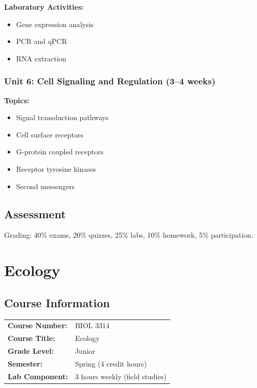 \documentclass[12pt,oneside]{book}
\begin{document}
\textbf{Laboratory Activities:}
\begin{itemize}
    \item Gene expression analysis
    \item PCR and qPCR
    \item RNA extraction
\end{itemize}

\subsection{Unit 6: Cell Signaling and Regulation (3--4 weeks)}

\textbf{Topics:}
\begin{itemize}
    \item Signal transduction pathways
    \item Cell surface receptors
    \item G-protein coupled receptors
    \item Receptor tyrosine kinases
    \item Second messengers
\end{itemize}

\section{Assessment}

Grading: 40\% exams, 20\% quizzes, 25\% labs, 10\% homework, 5\% participation.


\chapter{Ecology}

\section{Course Information}

\begin{tabular}{ll}
\textbf{Course Number:} & BIOL 3314 \\
\textbf{Course Title:} & Ecology \\
\textbf{Grade Level:} & Junior \\
\textbf{Semester:} & Spring (4 credit hours) \\
\textbf{Lab Component:} & 3 hours weekly (field studies) \\
\end{tabular}
\end{document}
